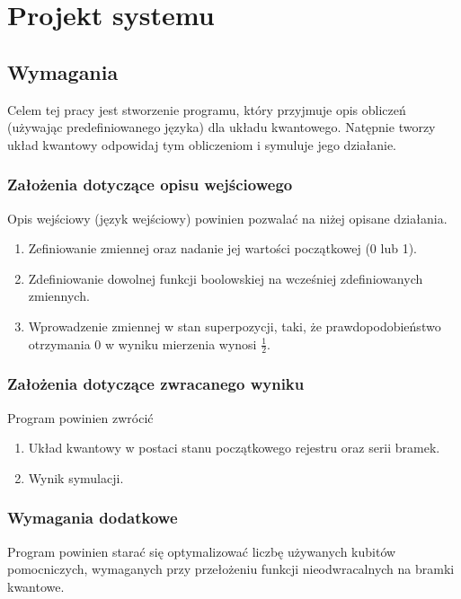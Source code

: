 \chapter{Projekt systemu}
\thispagestyle{chapterBeginStyle}
\label{rozdzial2}

\section{Wymagania}
Celem tej pracy jest stworzenie programu, który przyjmuje opis obliczeń (używając predefiniowanego języka) dla układu kwantowego. Natępnie tworzy układ kwantowy odpowidaj tym obliczeniom i symuluje jego działanie.
\subsection{Założenia dotyczące opisu wejściowego}
Opis wejściowy (język wejściowy) powinien pozwalać na niżej opisane działania.
\begin{enumerate}
    \item Zefiniowanie zmiennej oraz nadanie jej wartości początkowej (0 lub 1).
    \item Zdefiniowanie dowolnej funkcji boolowskiej na wcześniej zdefiniowanych zmiennych.
    \item Wprowadzenie zmiennej w stan superpozycji, taki, że prawdopodobieństwo otrzymania 0 w wyniku mierzenia wynosi $\frac{1}{2}$.
\end{enumerate}
\subsection{Założenia dotyczące zwracanego wyniku}
Program powinien zwrócić
\begin{enumerate}
    \item Układ kwantowy w postaci stanu początkowego rejestru oraz serii bramek.
    \item Wynik symulacji.
\end{enumerate}
\subsection{Wymagania dodatkowe}
Program powinien starać się optymalizować liczbę używanych kubitów pomocniczych, wymaganych przy przełożeniu funkcji nieodwracalnych na bramki kwantowe.
